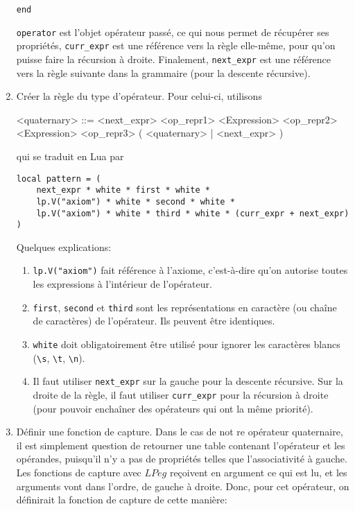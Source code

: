 \documentclass{article}
\begin{document}
\begin{enumerate}
\begin{verbatim}
end
	\end{verbatim}
	\lstinline|operator| est l'objet opérateur passé, ce qui nous permet de récupérer ses propriétés, \lstinline|curr_expr| est une référence vers la règle elle-même, pour qu'on puisse faire la récursion à droite. Finalement, \lstinline|next_expr| est une référence vers la règle suivante dans la grammaire (pour la descente récursive).
	\item Créer la règle du type d'opérateur. Pour celui-ci, utilisons
	\begin{grammar}
		<quaternary> ::= <next\_expr> <op\_repr1> <Expression> <op\_repr2> <Expression> <op\_repr3> ( <quaternary> | <next\_expr> )
	\end{grammar}
	qui se traduit en Lua par
	\begin{verbatim}
local pattern = (
	next_expr * white * first * white *
	lp.V("axiom") * white * second * white * 
	lp.V("axiom") * white * third * white * (curr_expr + next_expr) 
)
	\end{verbatim}
	Quelques explications:
	\begin{enumerate}
		\item \texttt{lp.V("axiom")} fait référence à l'axiome, c'est-à-dire qu'on autorise toutes les expressions à l'intérieur de l'opérateur.
		\item \texttt{first}, \texttt{second} et \texttt{third} sont les représentations en caractère (ou chaîne de caractères) de l'opérateur. Ils peuvent être identiques.
		\item \texttt{white} doit obligatoirement être utilisé pour ignorer les caractères blancs (\lstinline|\s|, \lstinline|\t|, \lstinline|\n|).
		\item Il faut utiliser \lstinline|next_expr| sur la gauche pour la descente récursive. Sur la droite de la règle, il faut utiliser \lstinline|curr_expr| pour la récursion à droite (pour pouvoir enchaîner des opérateurs qui ont la même priorité).
	\end{enumerate}
	\item Définir une fonction de capture. Dans le cas de not
	re opérateur quaternaire, il est simplement question de retourner une table contenant l'opérateur et les opérandes, puisqu'il n'y a pas de propriétés telles que l'associativité à gauche. \\
	Les fonctions de capture avec $LPeg$ reçoivent en argument ce qui est lu, et les arguments vont dans l'ordre, de gauche à droite. Donc, pour cet opérateur, on définirait la fonction de capture de cette manière:

\end{enumerate}
\end{document}
